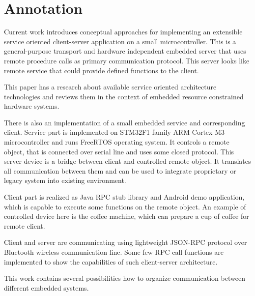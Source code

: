 \clearpage\vspace*{\fill}
\section*{Annotation}
Current work introduces conceptual approaches for implementing an extensible
service oriented client-server application on a small microcontroller.
This is a general-purpose transport and hardware independent embedded server
that uses remote procedure calls as primary communication protocol.
This server looks like remote service that could provide defined functions to
the client.

This paper has a research about available service oriented architecture technologies and reviews them in the context of embedded resource constrained hardware systems.

There is also an implementation of a small embedded service and corresponding client.
Service part is implemented on STM32F1 family ARM Cortex-M3 microcontroller and runs FreeRTOS operating system.
It controls a remote object, that is connected over serial line and uses some closed protocol. 
This server device is a bridge between client and controlled remote object. 
It translates all communication between them and can be used to integrate proprietary or legacy system into existing environment. 

Client part is realized as Java RPC stub library  and Android demo application, which is capable to execute some functions on the remote object.
An example of controlled device here is the coffee machine, which can prepare a cup of coffee for remote client.

Client and server are communicating using lightweight JSON-RPC protocol over Bluetooth wireless communication line.
Some few RPC call functions are implemented to show the capabilities of such client-server architecture.

This work contains several possibilities how to organize communication between different embedded systems.

\vspace{\fill}
\clearpage